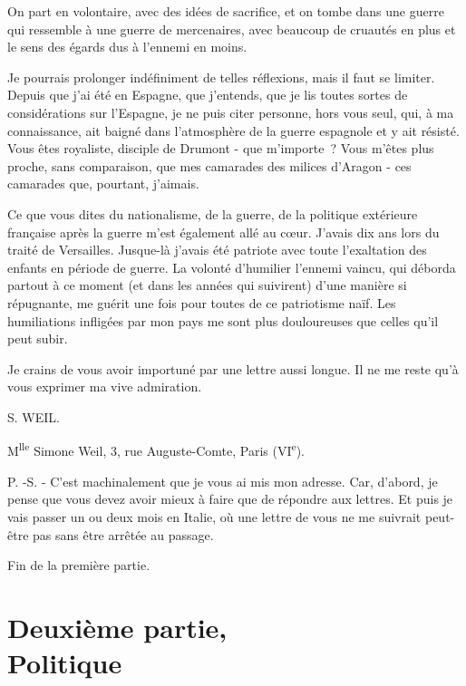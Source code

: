 \documentclass[french,twoside]{book} %
\begin{document}
On part en volontaire, avec des idées de sacrifice, et on tombe dans une guerre qui ressemble à une guerre de mercenaires, avec beaucoup de cruautés en plus et le sens des égards dus à l'ennemi en moins.\par
Je pourrais prolonger indéfiniment de telles réflexions, mais il faut se limiter. Depuis que j'ai été en Espagne, que j'entends, que je lis toutes sortes de considérations sur l'Espagne, je ne puis citer personne, hors vous seul, qui, à ma connaissance, ait baigné dans l'atmosphère de la guerre espagnole et y ait résisté. Vous êtes royaliste, disciple de Drumont - que m'importe ? Vous m'êtes plus proche, sans comparaison, que mes camarades des milices d'Aragon - ces camarades que, pourtant, j'aimais.\par
Ce que vous dites du nationalisme, de la guerre, de la politique extérieure française après la guerre m'est également allé au cœur. J'avais dix ans lors du traité de Versailles. Jusque-là j'avais été patriote avec toute l'exaltation des enfants en période de guerre. La volonté d'humilier l'ennemi vaincu, qui déborda partout à ce moment (et dans les années qui suivirent) d'une manière si répugnante, me guérit une fois pour toutes de ce patriotisme naïf. Les humiliations infligées par mon pays me sont plus douloureuses que celles qu'il peut subir.\par
Je crains de vous avoir importuné par une lettre aussi longue. Il ne me reste qu'à vous exprimer ma vive admiration.\par
S. WEIL.\par
\par
M\textsuperscript{lle} Simone Weil, 3, rue Auguste-Comte, Paris (VI\textsuperscript{e}).\par
P. -S. - C'est machinalement que je vous ai mis mon adresse. Car, d'abord, je pense que vous devez avoir mieux à faire que de répondre aux lettres. Et puis je vais passer un ou deux mois en Italie, où une lettre de vous ne me suivrait peut-être pas sans être arrêtée au passage.\par
Fin de la première partie.
\section[Deuxième partie, Politique]{Deuxième partie, \\
Politique}\renewcommand{\leftmark}{Deuxième partie, \\
Politique}

\noindent \par
\par
\end{document}
